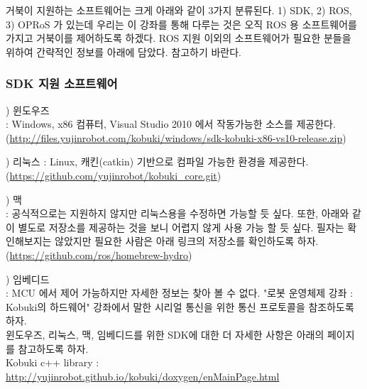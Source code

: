거북이 지원하는 소프트웨어는 크게 아래와 같이 3가지 분류된다. 1) SDK, 2) ROS, 3) OPRoS 가 있는데 우리는 이 강좌를 통해 다루는 것은 오직 ROS 용 소프트웨어를 가지고 거북이를 제어하도록 하겠다. ROS 지원 이외의 소프트웨어가 필요한 분들을 위하여 간략적인 정보를 아래에 담았다. 참고하기 바란다.

\subsubsection{SDK 지원 소프트웨어}

\setcounter{num}{0}

\vspace{\baselineskip}
\noindent
{}
) 윈도우즈\\
: Windows, x86 컴퓨터, Visual Studio 2010 에서 작동가능한 소스를 제공한다.\\  
(\url{http://files.yujinrobot.com/kobuki/windows/sdk-kobuki-x86-vs10-release.zip})

\vspace{\baselineskip}
\noindent
{}
) 리눅스 
: Linux, 캐킨(catkin) 기반으로 컴파일 가능한 환경을 제공한다.\\
(\url{https://github.com/yujinrobot/kobuki_core.git})

\vspace{\baselineskip}
\noindent
{}
) 맥\\
: 공식적으로는 지원하지 않지만 리눅스용을 수정하면 가능할 듯 싶다. 또한, 아래와 같이 별도로 저장소를 제공하는 것을 보니 어렵지 않게 사용 가능 할 듯 싶다. 필자는 확인해보지는 않았지만 필요한 사람은 아래 링크의 저장소를 확인하도록 하자.\\
(\url{https://github.com/ros/homebrew-hydro})

\vspace{\baselineskip}
\noindent
{}
) 임베디드\\
: MCU 에서 제어 가능하지만 자세한 정보는 찾아 볼 수 없다. "로봇 운영체제 강좌 : Kobuki의 하드웨어" 강좌에서 말한 시리얼 통신을 위한 통신 프로토콜을 참조하도록 하자.\\

윈도우즈, 리눅스, 맥, 임베디드를 위한 SDK에 대한 더 자세한 사항은 아래의 페이지를 참고하도록 하자.\\
Kobuki c++ library : \url{http://yujinrobot.github.io/kobuki/doxygen/enMainPage.html}

